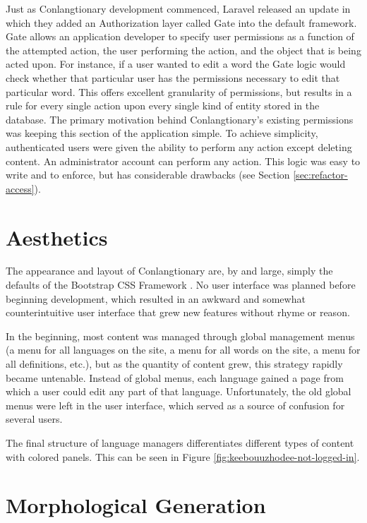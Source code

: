 Just as Conlangtionary development commenced, Laravel released an update in which they added an Authorization layer called Gate into the default framework. Gate allows an application developer to specify user permissions as a function of the attempted action, the user performing the action, and the object that is being acted upon. For instance, if a user wanted to edit a word the Gate logic would check whether that particular user has the permissions necessary to edit that particular word. This offers excellent granularity of permissions, but results in a rule for every single action upon every single kind of entity stored in the database. The primary motivation behind Conlangtionary's existing permissions was keeping this section of the application simple. To achieve simplicity, authenticated users were given the ability to perform any action except deleting content. An administrator account can perform any action. This logic was easy to write and to enforce, but has considerable drawbacks (see Section \ref{sec:refactor-access}).

\section{Aesthetics}
\label{sec:aesthetics}

The appearance and layout of Conlangtionary are, by and large, simply the defaults of the Bootstrap CSS Framework \cite{Bootstrap}. No user interface was planned before beginning development, which resulted in an awkward and somewhat counterintuitive user interface that grew new features without rhyme or reason.

In the beginning, most content was managed through global management menus (a menu for all languages on the site, a menu for all words on the site, a menu for all definitions, etc.), but as the quantity of content grew, this strategy rapidly became untenable. Instead of global menus, each language gained a page from which a user could edit any part of that language. Unfortunately, the old global menus were left in the user interface, which served as a source of confusion for several users.

The final structure of language managers differentiates different types of content with colored panels. This can be seen in Figure \ref{fig:keebouuzhodee-not-logged-in}.

\section{Morphological Generation}
\label{sec:morph-gen}

